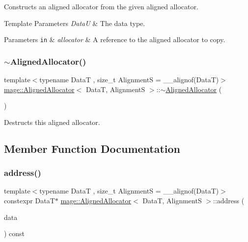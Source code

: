 Constructs an aligned allocator from the given aligned allocator.


\begin{DoxyTemplParams}{Template Parameters}
{\em DataU} & The data type. \\
\hline
\end{DoxyTemplParams}

\begin{DoxyParams}[1]{Parameters}
\mbox{\tt in}  & {\em allocator} & A reference to the aligned allocator to copy. \\
\hline
\end{DoxyParams}
\hypertarget{structmage_1_1_aligned_allocator_a98bda5c375a177eaa71cd622622451eb}{}\label{structmage_1_1_aligned_allocator_a98bda5c375a177eaa71cd622622451eb} 
\subsubsection{\texorpdfstring{$\sim$\+Aligned\+Allocator()}{~AlignedAllocator()}}
{\footnotesize\ttfamily template$<$typename DataT , size\+\_\+t AlignmentS = \+\_\+\+\_\+alignof(\+Data\+T)$>$ \\
\hyperlink{structmage_1_1_aligned_allocator}{mage\+::\+Aligned\+Allocator}$<$ DataT, AlignmentS $>$\+::$\sim$\hyperlink{structmage_1_1_aligned_allocator}{Aligned\+Allocator} (\begin{DoxyParamCaption}{ }\end{DoxyParamCaption})\hspace{0.3cm}{\ttfamily [default]}}

Destructs this aligned allocator. 

\subsection{Member Function Documentation}
\hypertarget{structmage_1_1_aligned_allocator_a7d0757a4532e6511c06b139af0220ed3}{}\label{structmage_1_1_aligned_allocator_a7d0757a4532e6511c06b139af0220ed3} 
\subsubsection{\texorpdfstring{address()}{address()}\hspace{0.1cm}{\footnotesize\ttfamily [1/2]}}
{\footnotesize\ttfamily template$<$typename DataT , size\+\_\+t AlignmentS = \+\_\+\+\_\+alignof(\+Data\+T)$>$ \\
constexpr DataT$\ast$ \hyperlink{structmage_1_1_aligned_allocator}{mage\+::\+Aligned\+Allocator}$<$ DataT, AlignmentS $>$\+::address (\begin{DoxyParamCaption}\item[{DataT \&}]{data }\end{DoxyParamCaption}) const\hspace{0.3cm}{\ttfamily [noexcept]}}

